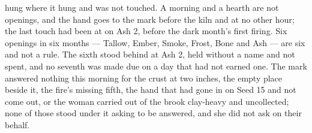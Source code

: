 \scenebreak

 hung where it hung and was not touched. A morning and a hearth are not openings, and the hand goes to the mark before the kiln and at no other hour; the last touch had been at  on Ash 2, before the dark month's first firing. Six openings in six months --- Tallow, Ember, Smoke, Frost, Bone and Ash --- are six and not a rule. The sixth stood behind at Ash 2, held without a name and not spent, and no seventh was made due on a day that had not earned one. The mark answered nothing this morning for the crust at two inches, the empty place beside it, the fire's missing fifth, the hand that had gone in on Seed 15 and not come out, or the woman carried out of the brook clay-heavy and uncollected; none of those stood under it asking to be answered, and she did not ask on their behalf.

\scenebreak

